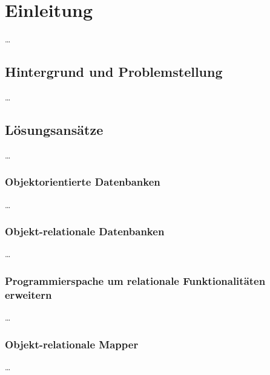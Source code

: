 
\chapter{Einleitung} %

\label{Chapter1} %


\newcommand{\keyword}[1]{\textbf{#1}}
\newcommand{\tabhead}[1]{\textbf{#1}}
\newcommand{\code}[1]{\texttt{#1}}
\newcommand{\file}[1]{\texttt{\bfseries#1}}
\newcommand{\option}[1]{\texttt{\itshape#1}}


…

\section{Hintergrund und Problemstellung}

…

\section{Lösungsansätze}

…

\subsection{Objektorientierte Datenbanken}

…

\subsection{Objekt-relationale Datenbanken}

…

\subsection{Programmierspache um relationale Funktionalitäten erweitern}

…

\subsection{Objekt-relationale Mapper}

…
